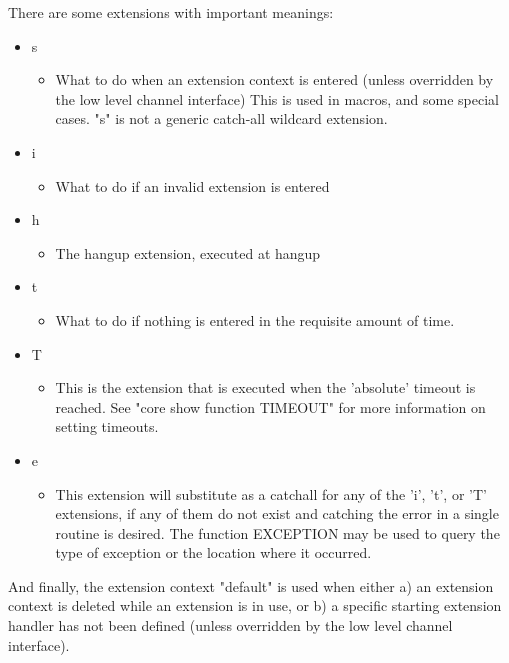 There are some extensions with important meanings:

\begin{itemize}
  \item s	
  \begin{itemize}
    \item What to do when an extension context is entered (unless
          overridden by the low level channel interface)
          This is used in macros, and some special cases.
          "s" is not a generic catch-all wildcard extension.
  \end{itemize}
  \item i
  \begin{itemize}
    \item What to do if an invalid extension is entered
  \end{itemize}
  \item h
  \begin{itemize}
    \item The hangup extension, executed at hangup
  \end{itemize}
  \item t
  \begin{itemize}
    \item What to do if nothing is entered in the requisite amount
          of time.
  \end{itemize}
  \item T
  \begin{itemize}
    \item This is the extension that is executed when the 'absolute'
          timeout is reached.  See "core show function TIMEOUT" for more
          information on setting timeouts.	
  \end{itemize}
  \item e
  \begin{itemize}
    \item This extension will substitute as a catchall for any of the
          'i', 't', or 'T' extensions, if any of them do not exist and
          catching the error in a single routine is desired.  The
          function EXCEPTION may be used to query the type of exception
          or the location where it occurred.
  \end{itemize}
\end{itemize}

And finally, the extension context "default" is used when either a) an
extension context is deleted while an extension is in use, or b) a specific
starting extension handler has not been defined (unless overridden by the
low level channel interface).
